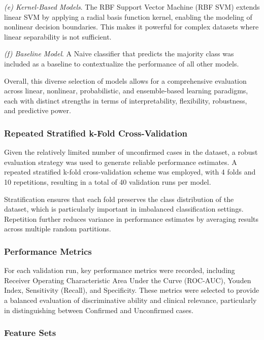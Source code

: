 \documentclass[pdflatex,sn-vancouver-num]{sn-jnl}
\begin{document}
\textit{(e) Kernel-Based Models}.
The RBF Support Vector Machine (RBF SVM) extends linear SVM by applying a radial basis function kernel, enabling the modeling of nonlinear decision boundaries. This makes it powerful for complex datasets where linear separability is not sufficient.

\textit{(f) Baseline Model}.
A Naive classifier that predicts the majority class was included as a baseline to contextualize the performance of all other models.

Overall, this diverse selection of models allows for a comprehensive evaluation across linear, nonlinear, probabilistic, and ensemble-based learning paradigms, each with distinct strengths in terms of interpretability, flexibility, robustness, and predictive power.

\subsubsection{Repeated Stratified k-Fold Cross-Validation}

Given the relatively limited number of unconfirmed cases in the dataset, a robust evaluation strategy was used to generate reliable performance estimates. A repeated stratified k-fold cross-validation scheme was employed, with 4 folds and 10 repetitions, resulting in a total of 40 validation runs per model.

Stratification ensures that each fold preserves the class distribution of the dataset, which is particularly important in imbalanced classification settings. Repetition further reduces variance in performance estimates by averaging results across multiple random partitions.



\subsubsection{Performance Metrics}
For each validation run, key performance metrics were recorded, including Receiver Operating Characteristic Area Under the Curve (ROC-AUC), Youden Index, Sensitivity (Recall), and Specificity. These metrics were selected to provide a balanced evaluation of discriminative ability and clinical relevance, particularly in distinguishing between Confirmed and Unconfirmed cases.

\subsubsection{Feature Sets}
\end{document}
